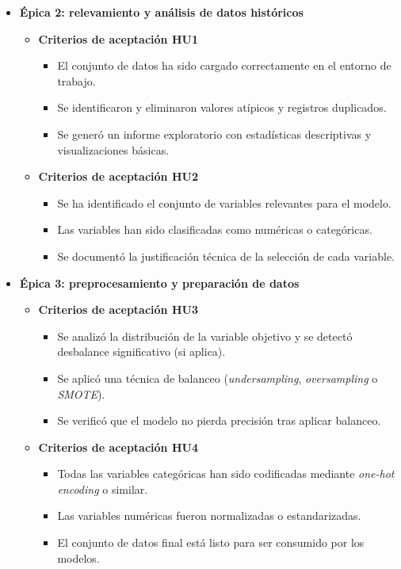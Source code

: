 \documentclass[
11pt, %
]{charter}
\begin{document}
\begin{itemize}
  \item \textbf{Épica 2: relevamiento y análisis de datos históricos}
    \begin{itemize}
      \item \textbf{Criterios de aceptación HU1}
      \begin{itemize}
        \item El conjunto de datos ha sido cargado correctamente en el entorno de trabajo.
        \item Se identificaron y eliminaron valores atípicos y registros duplicados.
        \item Se generó un informe exploratorio con estadísticas descriptivas y visualizaciones básicas.
      \end{itemize}
      \item \textbf{Criterios de aceptación HU2}
      \begin{itemize}
        \item Se ha identificado el conjunto de variables relevantes para el modelo.
        \item Las variables han sido clasificadas como numéricas o categóricas.
        \item Se documentó la justificación técnica de la selección de cada variable.
      \end{itemize}
    \end{itemize}

  \item \textbf{Épica 3: preprocesamiento y preparación de datos}
    \begin{itemize}
      \item \textbf{Criterios de aceptación HU3}
      \begin{itemize}
        \item Se analizó la distribución de la variable objetivo y se detectó desbalance significativo (si aplica).
        \item Se aplicó una técnica de balanceo (\textit{undersampling}, \textit{oversampling} o \textit{SMOTE}).
        \item Se verificó que el modelo no pierda precisión tras aplicar balanceo.
      \end{itemize}
      \item \textbf{Criterios de aceptación HU4}
      \begin{itemize}
        \item Todas las variables categóricas han sido codificadas mediante \textit{one-hot encoding} o similar.
        \item Las variables numéricas fueron normalizadas o estandarizadas.
        \item El conjunto de datos final está listo para ser consumido por los modelos.
      \end{itemize}
    \end{itemize}


\end{itemize}
\end{document}
